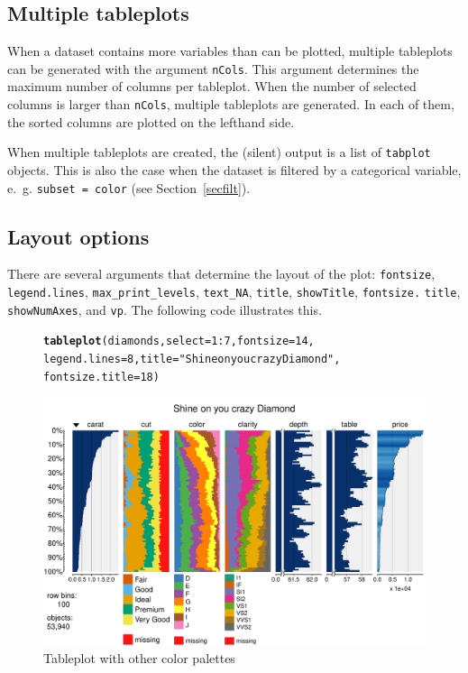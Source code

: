 \documentclass[11pt, fleqn, a4paper]{article}\usepackage{graphicx, color}
\makeatletter
\def\maxwidth{ %
  \ifdim\Gin@nat@width>\linewidth
    \linewidth
  \else
    \Gin@nat@width
  \fi
}
\newcommand{\hlfunctioncall}[1]{\textcolor[rgb]{0.501960784313725,0,0.329411764705882}{\textbf{#1}}}%
\newcommand{\hlstring}[1]{\textcolor[rgb]{0.6,0.6,1}{#1}}%
\newenvironment{kframe}{%
 \def\at@end@of@kframe{}%
 \ifinner\ifhmode%
  \def\at@end@of@kframe{\end{minipage}}%
  \begin{minipage}{\columnwidth}%
 \fi\fi%
 \def\FrameCommand##1{\hskip\@totalleftmargin \hskip-\fboxsep
 \colorbox{shadecolor}{##1}\hskip-\fboxsep
     \hskip-\linewidth \hskip-\@totalleftmargin \hskip\columnwidth}%
 \MakeFramed {\advance\hsize-\width
   \@totalleftmargin\z@ \linewidth\hsize
   \@setminipage}}%
 {\par\unskip\endMakeFramed%
 \at@end@of@kframe}
\newenvironment{knitrout}{}{} %
\makeatother
\begin{document}
\subsection{Multiple tableplots}\label{secmult}

When a dataset contains more variables than can be plotted, multiple tableplots can be generated with the argument {\tt nCols}. This argument determines the maximum number of columns per tableplot. When the number of selected columns is larger than {\tt nCols}, multiple tableplots are generated. In each of them, the sorted columns are plotted on the lefthand side. 

When multiple tableplots are created, the (silent) output is a list of {\tt tabplot} objects. This is also the case when the dataset is filtered by a categorical variable, e.~g. {\tt subset = color}
(see Section~\ref{secfilt}).

\subsection{Layout options}\label{seclay}
There are several arguments that determine the layout of the plot:
{\tt fontsize}, {\tt legend.lines}, {\tt max\_print\_levels}, {\tt text\_NA}, {\tt title}, {\tt showTitle}, {\tt fontsize.} {\tt title}, {\tt showNumAxes}, and {\tt vp}. The following code illustrates this.

\begin{figure}[htp]
\begin{knitrout}
\color{fgcolor}\begin{kframe}
\begin{alltt}
\hlfunctioncall{tableplot}(diamonds, select = 1:7, fontsize = 14, 
    legend.lines = 8, title = \hlstring{"Shine on you crazy Diamond"}, 
    fontsize.title = 18)
\end{alltt}
\end{kframe}
\includegraphics[width=\maxwidth]{figure/chunk10} 

\end{knitrout}

\caption{Tableplot with other color palettes}
\label{fig:tp6}
\end{figure}
\end{document}
